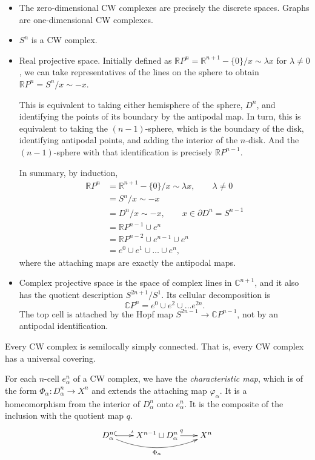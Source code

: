 \begin{example}
\begin{itemize}
\item The zero-dimensional CW complexes are
precisely the discrete spaces. Graphs are
one-dimensional CW complexes.
\item $S^n$ is a CW complex.
\item Real projective space. Initially
defined as
$\mathbb{R}
P^n=\mathbb{R}^{n+1}-\{0\}/x\sim\lambda x$
for $\lambda\neq0$,
we can take representatives of the lines on
the sphere to
obtain $\mathbb{R} P^n=S^n/x\sim -x$.

This is equivalent to taking either
hemisphere of the sphere,
$D^n$, and identifying the points of its
boundary by the
antipodal map. In turn, this is equivalent to
taking the
$(n-1)$-sphere, which is the boundary of the
disk,
identifying antipodal points, and adding the
interior of the
$n$-disk. And the $(n-1)$-sphere with that
identification is
precisely $\mathbb{R} P^{n-1}$.

In summary, by induction,
$$
\begin{aligned}
\mathbb{R} P^n
&=\mathbb{R}^{n+1}-\{0\}/x\sim\lambda x,
\qquad\lambda\neq0\\
&=S^n/x\sim-x\\
&=D^n/x\sim-x,
\qquad x\in\partial D^n=S^{n-1}\\
&=\mathbb{R} P^{n-1}\cup e^n\\
&=\mathbb{R} P^{n-2}\cup e^{n-1}\cup e^n\\
&=e^0\cup e^1\cup\ldots\cup e^n,
\end{aligned}
$$
where the attaching maps are exactly the
antipodal maps.
\item Complex projective space is the space
of
complex lines in $\mathbb{C}^{n+1}$, and it
also has the quotient description
$S^{2n+1}/S^1$. Its cellular decomposition is
$$
\mathbb{C} P^n=e^0\cup e^2\cup\ldots e^{2n}.
$$
The top cell is attached by the Hopf map
$S^{2n-1}\to\mathbb{C}P^{n-1}$, not by an
antipodal identification.
\end{itemize}
\end{example}

\begin{exercise}
Every CW complex is semilocally simply
connected. That is,
every CW complex has a universal covering.
\end{exercise}

\begin{definition}
For each $n$-cell $e^n_\alpha$ of a CW
complex, we have the
\emph{characteristic map}, which is of the
form
$\Phi_\alpha:D^n_\alpha\to X^n$ and extends
the attaching map
$\varphi_\alpha$. It is a homeomorphism from
the interior of
$D^n_\alpha$ onto $e^n_\alpha$.
It is the composite of the inclusion with the
quotient map $q$.
$$
\xymatrix@C=2em{
D^n_\alpha \ar@{^{(}->}[r]^\iota
  \ar@/_1.2pc/[rr]_{\Phi_\alpha}
 & X^{n-1}\sqcup D^n_\alpha
   \ar[r]^q
 & X^n
}
$$
\end{definition}

